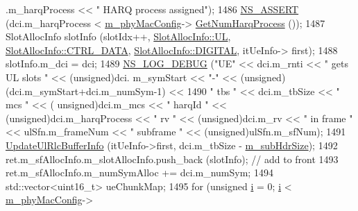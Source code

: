 \begin{DoxyCode}
      .m\_harqProcess << \textcolor{stringliteral}{" HARQ process assigned"});
1486                         \hyperlink{assert_8h_a6dccdb0de9b252f60088ce281c49d052}{NS\_ASSERT} (dci.m\_harqProcess < \hyperlink{classns3_1_1MmWaveMacScheduler_a24d7af4971d2e500fe543cefbafa2fd9}{m\_phyMacConfig}->
      \hyperlink{classns3_1_1MmWavePhyMacCommon_a40773d84172ebeb5aff125f56ebcc5ac}{GetNumHarqProcess} ());
1487                         SlotAllocInfo slotInfo (slotIdx++, \hyperlink{structns3_1_1SlotAllocInfo_a6cad60db1d39034f1851e2cea625fe5da916b5be54594ead6ed677c570311cad2}{SlotAllocInfo::UL}, 
      \hyperlink{structns3_1_1SlotAllocInfo_a3ea7cb503bfd0c9a4df55a71b81b9331a1ea636c3f068558fabacbc39934309b8}{SlotAllocInfo::CTRL\_DATA}, \hyperlink{structns3_1_1SlotAllocInfo_adcbd067d82be6260b3399167d8f0b4eca47a67c342db658a08ded9ce4b49417ea}{SlotAllocInfo::DIGITAL}, itUeInfo->
      first);
1488                         slotInfo.m\_dci = dci;
1489                         \hyperlink{group__logging_ga413f1886406d49f59a6a0a89b77b4d0a}{NS\_LOG\_DEBUG} (\textcolor{stringliteral}{"UE"} << dci.m\_rnti << \textcolor{stringliteral}{" gets UL slots "} << (\textcolor{keywordtype}{unsigned})dci.
      m\_symStart << \textcolor{stringliteral}{"-"} << (\textcolor{keywordtype}{unsigned})(dci.m\_symStart+dci.m\_numSym-1) <<
1490                                                              \textcolor{stringliteral}{" tbs "} << dci.m\_tbSize << \textcolor{stringliteral}{" mcs "} << (\textcolor{keywordtype}{
      unsigned})dci.m\_mcs << \textcolor{stringliteral}{" harqId "} << (\textcolor{keywordtype}{unsigned})dci.m\_harqProcess << \textcolor{stringliteral}{" rv "} << (\textcolor{keywordtype}{unsigned})dci.m\_rv << \textcolor{stringliteral}{" in frame "} << 
      ulSfn.m\_frameNum << \textcolor{stringliteral}{" subframe "} << (\textcolor{keywordtype}{unsigned})ulSfn.m\_sfNum);
1491                         \hyperlink{classns3_1_1MmWaveFlexTtiMacScheduler_a3ee98517bf46d32cd07cd55bcc8c9f86}{UpdateUlRlcBufferInfo} (itUeInfo->first, dci.m\_tbSize - 
      \hyperlink{classns3_1_1MmWaveFlexTtiMacScheduler_ac2c5c229b7350214b5ff56c2a9167020}{m\_subHdrSize});
1492                         ret.m\_sfAllocInfo.m\_slotAllocInfo.push\_back (slotInfo);  \textcolor{comment}{// add to front}
1493                         ret.m\_sfAllocInfo.m\_numSymAlloc += dci.m\_numSym;
1494                         std::vector<uint16\_t> ueChunkMap;
1495                         \textcolor{keywordflow}{for} (\textcolor{keywordtype}{unsigned} \hyperlink{bernuolliDistribution_8m_a6f6ccfcf58b31cb6412107d9d5281426}{i} = 0; \hyperlink{bernuolliDistribution_8m_a6f6ccfcf58b31cb6412107d9d5281426}{i} < \hyperlink{classns3_1_1MmWaveMacScheduler_a24d7af4971d2e500fe543cefbafa2fd9}{m\_phyMacConfig}->

\end{DoxyCode}
